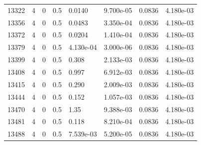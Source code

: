 \documentclass[preview]{standalone}
\begin{document}
{{{{{{{{{{{{{{\begin{tabular}{L{1.2cm}C{1.2cm} C{0.3cm}C{0.5cm} C{1.4cm}C{1.4cm} C{1.4cm}C{1.4cm}}
  13322  &     4  & 0     & 0.5 &  0.0140  & 9.700e-05  & 0.0836 &  4.180e-03   \\ 
  13356  &     4  & 0     & 0.5 &  0.0483  & 3.350e-04  & 0.0836 &  4.180e-03   \\ 
  13372  &     4  & 0     & 0.5 &  0.0204  & 1.410e-04  & 0.0836 &  4.180e-03   \\ 
  13379  &     4  & 0     & 0.5 &  4.130e-04  & 3.000e-06  & 0.0836 &  4.180e-03   \\ 
  13399  &     4  & 0     & 0.5 &  0.308  & 2.133e-03  & 0.0836 &  4.180e-03   \\ 
  13408  &     4  & 0     & 0.5 &  0.997  & 6.912e-03  & 0.0836 &  4.180e-03   \\ 
  13415  &     4  & 0     & 0.5 &  0.290  & 2.009e-03  & 0.0836 &  4.180e-03   \\ 
  13444  &     4  & 0     & 0.5 &  0.152  & 1.057e-03  & 0.0836 &  4.180e-03   \\ 
  13470  &     4  & 0     & 0.5 &  1.35  & 9.388e-03  & 0.0836 &  4.180e-03   \\ 
  13481  &     4  & 0     & 0.5 &  0.118  & 8.210e-04  & 0.0836 &  4.180e-03   \\ 
  13488  &     4  & 0     & 0.5 &  7.539e-03  & 5.200e-05  & 0.0836 &  4.180e-03   \\ 
\hline 
\end{tabular} 

}}}}}}}}}}}}}}
\end{document}
